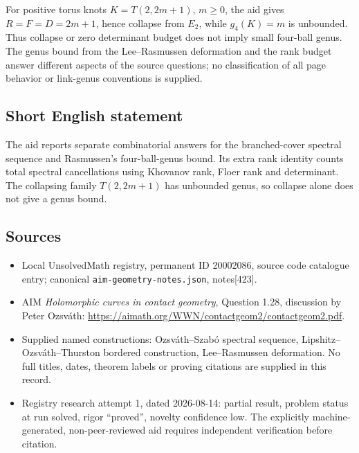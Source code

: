 \documentclass[11pt]{article}
\begin{document}
For positive torus knots $K=T(2,2m+1)$, $m\ge0$, the aid gives $R=F=D=2m+1$, hence collapse from $E_2$, while $g_4(K)=m$ is unbounded. Thus collapse or zero determinant budget does not imply small four-ball genus. The genus bound from the Lee--Rasmussen deformation and the rank budget answer different aspects of the source questions; no classification of all page behavior or link-genus conventions is supplied.
\subsection{Short English statement}
The aid reports separate combinatorial answers for the branched-cover spectral sequence and Rasmussen's four-ball-genus bound. Its extra rank identity counts total spectral cancellations using Khovanov rank, Floer rank and determinant. The collapsing family $T(2,2m+1)$ has unbounded genus, so collapse alone does not give a genus bound.
\subsection{Sources}
\begin{itemize}
\item Local UnsolvedMath registry, permanent ID 20002086, source code catalogue entry; canonical \texttt{aim-geometry-notes.json}, notes[423].
\item AIM \emph{Holomorphic curves in contact geometry}, Question 1.28, discussion by Peter Ozsv\'ath: \url{https://aimath.org/WWN/contactgeom2/contactgeom2.pdf}.
\item Supplied named constructions: Ozsv\'ath--Szab\'o spectral sequence, Lipshitz--Ozsv\'ath--Thurston bordered construction, Lee--Rasmussen deformation. No full titles, dates, theorem labels or proving citations are supplied in this record.
\item Registry research attempt 1, dated 2026-08-14: partial result, problem status at run solved, rigor ``proved'', novelty confidence low. The explicitly machine-generated, non-peer-reviewed aid requires independent verification before citation.
\end{itemize}
\end{document}
